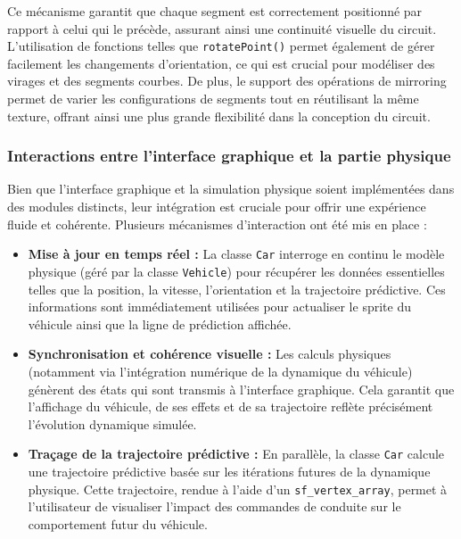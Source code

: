 Ce mécanisme garantit que chaque segment est correctement positionné par rapport à celui qui le précède, assurant ainsi une continuité visuelle du circuit.
L'utilisation de fonctions telles que \texttt{rotatePoint()} permet également de gérer facilement les changements d'orientation, ce qui est crucial pour modéliser des virages et des segments courbes.
De plus, le support des opérations de mirroring permet de varier les configurations de segments tout en réutilisant la même texture, offrant ainsi une plus grande flexibilité dans la conception du circuit.


\subsubsection{Interactions entre l'interface graphique et la partie physique}\label{subsubsec:interactions-entre-l-interface-graphique-et-la-partie-physique}
Bien que l'interface graphique et la simulation physique soient implémentées dans des modules distincts, leur intégration est cruciale pour offrir une expérience fluide et cohérente.
Plusieurs mécanismes d'interaction ont été mis en place :

\begin{itemize}
    \item \textbf{Mise à jour en temps réel :} La classe \texttt{Car} interroge en continu le modèle physique (géré par la classe \texttt{Vehicle}) pour récupérer les données essentielles telles que la position, la vitesse, l'orientation et la trajectoire prédictive.
    Ces informations sont immédiatement utilisées pour actualiser le \gls{sprite} du véhicule ainsi que la ligne de prédiction affichée.
    \item \textbf{Synchronisation et cohérence visuelle :} Les calculs physiques (notamment via l'intégration numérique de la dynamique du véhicule) génèrent des états qui sont transmis à l'interface graphique.
    Cela garantit que l'affichage du véhicule, de ses effets et de sa trajectoire reflète précisément l'évolution dynamique simulée.
    \item \textbf{Traçage de la trajectoire prédictive :} En parallèle, la classe \texttt{Car} calcule une trajectoire prédictive basée sur les itérations futures de la dynamique physique.
    Cette trajectoire, rendue à l'aide d'un \texttt{\gls{sf_vertex_array}}\cite{sfml_sf_vertexarray}, permet à l'utilisateur de visualiser l'impact des commandes de conduite sur le comportement futur du véhicule.
\end{itemize}

